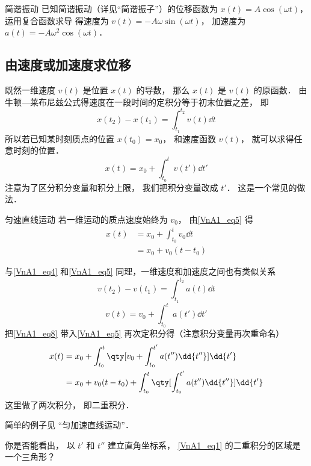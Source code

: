 \begin{example}{简谐振动}
已知简谐振动（详见“简谐振子”）的位移函数为 $x(t) = A\cos(\omega t)$， 运用复合函数求导 得速度为 $v(t) = -A\omega\sin(\omega t)$， 加速度为 $a(t) = -A\omega^2\cos(\omega t)$．
\end{example}

\subsection{由速度或加速度求位移}
既然一维速度 $v(t)$ 是位置 $x(t)$ 的导数， 那么 $x(t)$ 是 $v(t)$ 的原函数． 由牛顿—莱布尼兹公式得速度在一段时间的定积分等于初末位置之差， 即
\begin{equation}\label{VnA1_eq4}
x(t_2) - x(t_1) = \int_{t_1}^{t_2} v(t) \dd{t}
\end{equation}
所以若已知某时刻质点的位置 $x(t_0) = x_0$， 和速度函数 $v(t)$， 就可以求得任意时刻的位置．
\begin{equation}\label{VnA1_eq5}
x(t) = x_0 + \int_{t_0}^t v(t') \dd{t'}
\end{equation}
注意为了区分积分变量和积分上限， 我们把积分变量改成 $t'$． 这是一个常见的做法．

\begin{example}{匀速直线运动}
若一维运动的质点速度始终为 $v_0$， 由\autoref{VnA1_eq5} 得
\begin{equation}
\begin{aligned}
x(t) &= x_0 + \int_{t_0}^t v_0 \dd{t}\\
&= x_0 + v_0(t-t_0)
\end{aligned}
\end{equation}
\end{example}

与\autoref{VnA1_eq4} 和\autoref{VnA1_eq5} 同理，一维速度和加速度之间也有类似关系
\begin{equation}
v(t_2) - v(t_1) = \int_{t_1}^{t_2} a(t) \dd{t}
\end{equation}
\begin{equation}\label{VnA1_eq8}
v(t) = v_0 + \int_{t_0}^t a(t') \dd{t'}
\end{equation}
把\autoref{VnA1_eq8} 带入\autoref{VnA1_eq5} 再次定积分得（注意积分变量再次重命名）
\begin{equation}\label{VnA1_eq2}
\begin{aligned}
x(t) &= x_0 + \int_{t_0}^t  \qty[v_0 + \int_{t_0}^{t'} a(t'') \dd{t''}] \dd{t'}\\
&= x_0 + v_0 (t - t_0) + \int_{t_0}^t \qty[\int_{t_0}^{t'} a(t'') \dd{t''}] \dd{t'}\\
\end{aligned}
\end{equation}
这里做了两次积分， 即二重积分．

简单的例子见 “匀加速直线运动”．

\begin{exercise}{}
你是否能看出， 以 $t'$ 和 $t''$ 建立直角坐标系， \autoref{VnA1_eq1} 的二重积分的区域是一个三角形？
\end{exercise}
